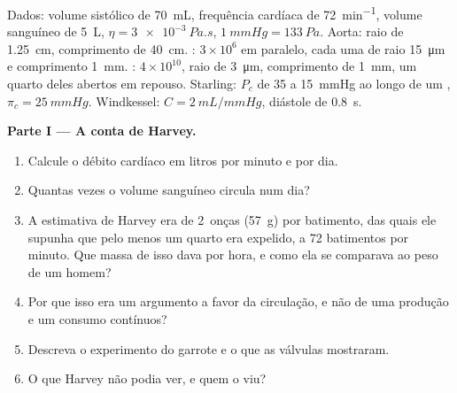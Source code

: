 \begin{problem}
\label{pb:b2:blood-circulation:1}
Dados: volume sistólico de \qty{70}{mL}, frequência cardíaca de
\qty{72}{min^{-1}}, volume sanguíneo de \qty{5}{L},
$\eta = \qty{3e-3}{Pa.s}$, $\qty{1}{mmHg} =
\qty{133}{Pa}$. Aorta: raio de \qty{1.25}{cm}, comprimento de
\qty{40}{cm}. : $3\times 10^{6}$ em paralelo, cada uma de
raio \qty{15}{\micro m} e comprimento \qty{1}{mm}. : $4\times
10^{10}$, raio de \qty{3}{\micro m}, comprimento de \qty{1}{mm}, um
quarto deles abertos em repouso. Starling: $P_c$ de 35 a
\qty{15}{mmHg} ao longo de um , $\pi_c = \qty{25}{mmHg}$.
Windkessel: $C =
\qty{2}{mL/mmHg}$, diástole de \qty{0.8}{s}.

\medskip
\noindent\textbf{Parte I --- A conta de Harvey.}
\begin{enumerate}
  \item Calcule o débito cardíaco em litros por minuto e por dia.
  \item Quantas vezes o volume sanguíneo circula num dia?
  \item A estimativa de Harvey era de 2~onças (\qty{57}{g}) por
        batimento, das quais ele supunha que pelo menos um quarto era
        expelido, a 72 batimentos por minuto. Que massa de  isso
        dava por hora, e como ela se comparava ao peso de um homem?
  \item Por que isso era um argumento a favor da circulação, e não de
        uma produção e um consumo contínuos?
  \item Descreva o experimento do garrote e o que as válvulas
        mostraram.
  \item O que Harvey não podia ver, e quem o viu?
\end{enumerate}


\end{problem}
